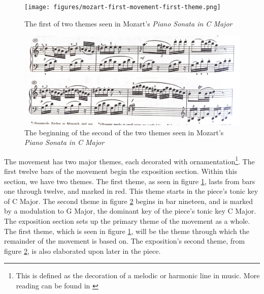\begin{figure}
    \centering
    \texttt{[image: figures/mozart-first-movement-first-theme.png]}
    \caption{The first of two themes seen in Mozart's \textit{Piano Sonata in C Major}}
    \label{fig:mozart-first-movement-first-theme}
\end{figure}

\begin{figure}
    \centering
    \includegraphics[width=\textwidth]{figures/mozart-first-movement-second-theme.jpg}
    \caption[The second theme in Mozart's \textit{Piano Sonata in C Major, K. 330}]{The beginning of the second of the two themes seen in Mozart's \textit{Piano Sonata in C Major}}
    \label{fig:mozart-first-movement-second-theme}
\end{figure}

The movement has two major themes, each decorated with ornamentation\footnote{This is defined as the decoration of a melodic or harmonic line in music. More reading can be found in \citeauthor{Latham_2011} \autocite{Burkholder_Grout_Palisca_2014}}. The first twelve bars of the movement begin the exposition section. Within this section, we have two themes. The first theme, as seen in figure \ref{fig:mozart-first-movement-first-theme}\autocite{Henle_1977}, lasts from bars one through twelve, and marked in red. This theme starts in the piece's tonic key of C Major. The second theme in figure \ref{fig:mozart-first-movement-second-theme}\autocite{Henle_1977} begins in bar nineteen, and is marked by a modulation to G Major, the dominant key of the piece's tonic key C Major. The exposition section sets up the primary theme of the movement as a whole. The first theme, which is seen in figure \ref{fig:mozart-first-movement-first-theme}\autocite{Henle_1977}, will be the theme through which the remainder of the movement is based on. The exposition's second theme, from figure \ref{fig:mozart-first-movement-second-theme}\autocite{Henle_1977}, is also elaborated upon later in the piece. 

